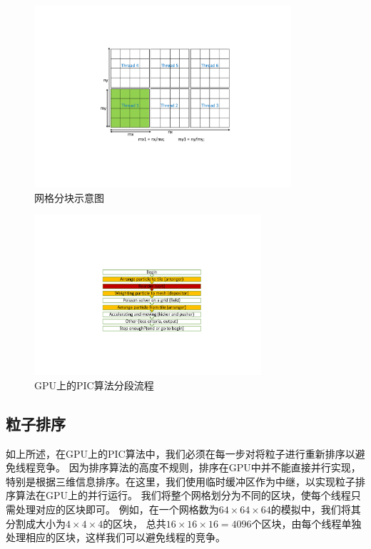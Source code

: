 \begin{figure}[!htb]
    \centering
    \includegraphics[width=0.85\textwidth]{Img/3PIC_tile.pdf}
    \caption{网格分块示意图}
    \label{fig:PIC_tile}
\end{figure}

\begin{figure}[!htb]
    \centering
    \includegraphics[width=0.75\textwidth]{Img/3PIC_flow_reorder.pdf}
    \caption{GPU上的PIC算法分段流程}
    \label{fig:PIC_flow_reorder}
\end{figure}



\subsection{粒子排序}
\label{section:PIC_GPU_reorder}
如上所述，在GPU上的PIC算法中，我们必须在每一步对将粒子进行重新排序以避免线程竞争。
因为排序算法的高度不规则，排序在GPU中并不能直接并行实现，特别是根据三维信息排序。在这里，我们使用临时缓冲区作为中继，以实现粒子排序算法在GPU上的并行运行。
我们将整个网格划分为不同的区块，使每个线程只需处理对应的区块即可。
例如，在一个网格数为$64 \times 64 \times 64$的模拟中，我们将其分割成大小为$4 \times 4 \times 4$的区块，
总共$16 \times 16 \times 16 = 4096$个区块，由每个线程单独处理相应的区块，这样我们可以避免线程的竞争。

